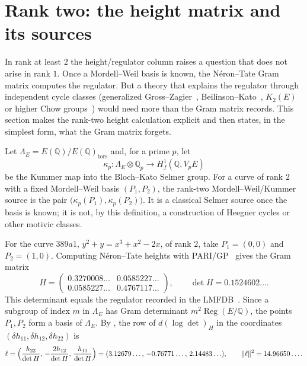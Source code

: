 \documentclass[11pt]{article}
\theoremstyle{definition}
\newcommand{\Q}{\mathbb{Q}}
\newcommand{\Qp}{\mathbb{Q}_p}
\newcommand{\Reg}{\operatorname{Reg}}
\newcommand{\tors}{\operatorname{tors}}
\newcommand{\Hf}{H^1_f}
\begin{document}
 \section{Rank two: the height matrix and its sources}
\label{sec:higher-rank-no-go}

In rank at least $2$ the height/regulator column raises a question that
does not arise in rank $1$.  Once a Mordell--Weil basis is known, the
N\'eron--Tate Gram matrix computes the regulator.  But a theory that
explains the regulator through independent cycle classes (generalized
Gross--Zagier~\citep{GrossZagier1986}, Beilinson--Kato~\citep{Beilinson1985,Kato2004},
$K_2(E)$ or higher Chow groups~\citep{Bloch1986}) would need more than the
Gram matrix records.  This section makes the rank-two height calculation
explicit and then states, in the simplest form, what the Gram matrix
forgets.

\begin{definition}\label{def:apparatus:rank-two-kummer-source}
Let $\Lambda_E=E(\Q)/E(\Q)_{\tors}$ and, for a prime $p$, let
\[
  \kappa_p:\Lambda_E\otimes\Qp\longrightarrow \Hf(\Q,V_pE)
\]
be the Kummer map into the Bloch--Kato Selmer group.  For a curve of rank
$2$ with a fixed Mordell--Weil basis $(P_1,P_2)$, the rank-two
Mordell--Weil/Kummer source is the pair
$\bigl(\kappa_p(P_1),\kappa_p(P_2)\bigr)$.  It is a classical Selmer source
once the basis is known; it is not, by this definition, a construction of
Heegner cycles or other motivic classes.
\end{definition}

For the curve $389a1$, $y^2+y=x^3+x^2-2x$, of rank $2$, take
$P_1=(0,0)$ and $P_2=(1,0)$.  Computing N\'eron--Tate heights with
PARI/GP~\citep{PARI2023} gives the Gram matrix
\[
  H=\begin{pmatrix}0.3270008\ldots & 0.0585227\ldots\\
  0.0585227\ldots & 0.4767117\ldots\end{pmatrix},
  \qquad
  \det H=0.1524602\ldots .
\]
This determinant equals the regulator recorded in the LMFDB~\citep{LMFDB}.
Since a subgroup of index $m$ in $\Lambda_E$ has Gram determinant
$m^2\Reg(E/\Q)$, the points $P_1,P_2$ form a basis of $\Lambda_E$.  By
, the row of
$d(\log\det)_H$ in the coordinates
$(\delta h_{11},\delta h_{12},\delta h_{22})$ is
\[
  \ell=\Bigl(\frac{h_{22}}{\det H},\,-\frac{2h_{12}}{\det H},\,
  \frac{h_{11}}{\det H}\Bigr)
  =(3.12679\ldots,\,-0.76771\ldots,\,2.14483\ldots),
  \qquad
  \|\ell\|^2=14.96650\ldots .
\]
\end{document}
